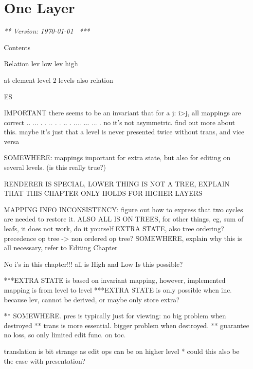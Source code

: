 \chapter{One Layer}
\label{chap:singleLayer}

{\em *** Version: \today~ ***}
\bc



Contents


Relation
lev low lev high

at element level 2 levels also relation

ES









IMPORTANT there seems to be an invariant that for a j:  i>j, all mappings are correct 
  ..           ...       
 .  .    ..   .   .   .. 
.    ....  ...     ...  .
 no it's not asymmetric. find out more about this.
 maybe it's just that a level is never presented twice without trans, and vice versa


SOMEWHERE: mappings important for extra state, but also for editing on several levels. (is this really true?)

RENDERER IS SPECIAL, LOWER THING IS NOT A TREE, EXPLAIN THAT THIS CHAPTER ONLY HOLDS FOR HIGHER LAYERS

MAPPING INFO INCONSISTENCY: figure out how to express that two cycles are needed to restore it.
ALSO ALL IS ON TREES, for other things, eg, sum of leafs, it does not work, do it yourself
EXTRA STATE, also tree ordering? precedence op tree -> non ordered op tree?
SOMEWHERE, explain why this is all necessary, refer to Editing Chapter

No i's in this chapter!!! all is High and Low Is this possible?

***EXTRA STATE is based on invariant mapping, however, implemented mapping is from level to level
***EXTRA STATE is only possible when inc. because lev, cannot be derived, or maybe only store extra?

** SOMEWHERE. pres is typically just for viewing: no big problem when destroyed
** trans is more essential. bigger problem when destroyed.
** guarantee no loss, so only limited edit func. on toc.

translation is bit strange as edit ops can be on higher level
* could this also be the case with presentation?



